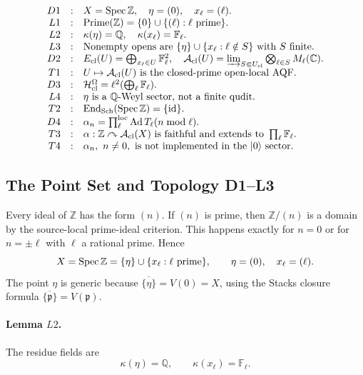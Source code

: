\[
\begin{array}{rcl}
D1&:&X=\operatorname{Spec}\mathbb Z,\quad \eta=(0),\quad x_\ell=(\ell).\\
L1&:&\operatorname{Prime}(\mathbb Z)=\{0\}\cup\{(\ell):\ell\text{ prime}\}.\\
L2&:&\kappa(\eta)=\mathbb Q,\quad \kappa(x_\ell)=\mathbb F_\ell.\\
L3&:&\text{Nonempty opens are }\{\eta\}\cup\{x_\ell:\ell\notin S\}\text{ with }S\text{ finite}.\\
D2&:&E_{\rm cl}(U)=\bigoplus_{x_\ell\in U}\mathbb F_\ell^2,\quad \mathcal A_{\rm cl}(U)=\varinjlim_{S\Subset U_{\rm cl}}\bigotimes_{\ell\in S}M_\ell(\mathbb C).\\
T1&:&U\mapsto\mathcal A_{\rm cl}(U)\text{ is the closed-prime open-local AQF}.\\
D3&:&\mathcal H^\Omega_{\rm cl}=\ell^2(\bigoplus_\ell\mathbb F_\ell).\\
L4&:&\eta\text{ is a }\mathbb Q\text{-Weyl sector, not a finite qudit.}\\
T2&:&\operatorname{End}_{\rm Sch}(\operatorname{Spec}\mathbb Z)=\{\mathrm{id}\}.\\
D4&:&\alpha_n=\prod_\ell^{\rm loc}\operatorname{Ad}T_\ell(n\bmod \ell).\\
T3&:&\alpha:\mathbb Z\curvearrowright\mathcal A_{\rm cl}(X)\text{ is faithful and extends to }\prod_\ell\mathbb F_\ell.\\
T4&:&\alpha_n,\ n\ne0,\text{ is not implemented in the }|0\rangle\text{ sector.}
\end{array}
\]

\subsection{The Point Set and Topology D1--L3}
Every ideal of \(\mathbb Z\) has the form \((n)\).  If \((n)\) is prime, then
\(\mathbb Z/(n)\) is a domain by the source-local prime-ideal criterion.  This
happens exactly for \(n=0\) or for \(n=\pm \ell\) with \(\ell\) a rational
prime.  Hence
\[
  X=\operatorname{Spec}\mathbb Z=\{\eta\}\cup\{x_\ell:\ell\text{ prime}\},
  \qquad \eta=(0),\quad x_\ell=(\ell).
\]
The point \(\eta\) is generic because
\(\overline{\{\eta\}}=V(0)=X\), using the Stacks closure formula
\(\overline{\{\mathfrak p\}}=V(\mathfrak p)\).

\paragraph{Lemma \(L2\).}
The residue fields are
\[
  \kappa(\eta)=\mathbb Q,\qquad \kappa(x_\ell)=\mathbb F_\ell .
\]

